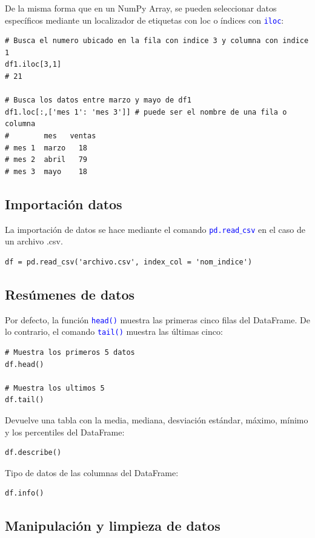 \documentclass[a4paper, 12pt]{book}
\begin{document}
De la misma forma que en un NumPy Array, se pueden seleccionar datos específicos mediante un localizador de etiquetas con loc o índices con \texttt{\textcolor{blue}{iloc}}:
\begin{verbatim}
# Busca el numero ubicado en la fila con indice 3 y columna con indice 1
df1.iloc[3,1]
# 21
	
# Busca los datos entre marzo y mayo de df1
df1.loc[:,['mes 1': 'mes 3']] # puede ser el nombre de una fila o columna
#        mes   ventas
# mes 1  marzo   18
# mes 2  abril   79
# mes 3  mayo    18
\end{verbatim}
\subsection{Importación datos}
La importación de datos se hace mediante el comando \texttt{\textcolor{blue}{pd.read$\_$csv}} en el caso de un archivo .csv.
\begin{verbatim}
df = pd.read_csv('archivo.csv', index_col = 'nom_indice')
\end{verbatim}

\subsection{Resúmenes de datos}
Por defecto, la función \texttt{\textcolor{blue}{head()}} muestra las primeras cinco filas del DataFrame. De lo contrario, el comando \texttt{\textcolor{blue}{tail()}} muestra las últimas cinco:
\begin{verbatim}
# Muestra los primeros 5 datos
df.head()
	
# Muestra los ultimos 5
df.tail()
\end{verbatim}

Devuelve una tabla con la media, mediana, desviación estándar, máximo, mínimo y los percentiles del DataFrame:
\begin{verbatim}
df.describe()
\end{verbatim}

Tipo de datos de las columnas del DataFrame:
\begin{verbatim}
df.info()
\end{verbatim}


\subsection{Manipulación y limpieza de datos}
\end{document}
